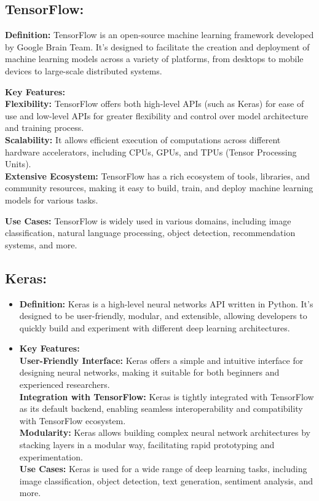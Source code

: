 \documentclass[oneside,a4paper,12pt]{report}
\begin{document}
\subsection{TensorFlow:}
\begin{itemize}
\item{\textbf{Definition:} TensorFlow is an open-source machine learning framework developed by Google Brain Team. It's designed to facilitate the creation and deployment of machine learning models across a variety of platforms, from desktops to mobile devices to large-scale distributed systems.}

\item{\textbf{Key Features:}\\
\textbf{Flexibility: }TensorFlow offers both high-level APIs (such as Keras) for ease of use and low-level APIs for greater flexibility and control over model architecture and training process.\\
\textbf{Scalability:} It allows efficient execution of computations across different hardware accelerators, including CPUs, GPUs, and TPUs (Tensor Processing Units).\\
\textbf{Extensive Ecosystem:} TensorFlow has a rich ecosystem of tools, libraries, and community resources, making it easy to build, train, and deploy machine learning models for various tasks.
\item{\textbf{Use Cases:}} TensorFlow is widely used in various domains, including image classification, natural language processing, object detection, recommendation systems, and more.
}
\end{itemize}
\subsection{Keras:}
\begin{itemize}
\item{\textbf{Definition:}}
Keras is a high-level neural networks API written in Python. It's designed to be user-friendly, modular, and extensible, allowing developers to quickly build and experiment with different deep learning architectures.
\item{\textbf{Key Features:}}\\
\textbf{User-Friendly Interface:} Keras offers a simple and intuitive interface for designing neural networks, making it suitable for both beginners and experienced researchers.\\
\textbf{Integration with TensorFlow:}
Keras is tightly integrated with TensorFlow as its default backend, enabling seamless interoperability and compatibility with TensorFlow ecosystem.\\
\textbf{Modularity:}
Keras allows building complex neural network architectures by stacking layers in a modular way, facilitating rapid prototyping and experimentation.\\
\textbf{Use Cases: }Keras is used for a wide range of deep learning tasks, including image classification, object detection, text generation, sentiment analysis, and more.

\end{itemize}
\end{document}
